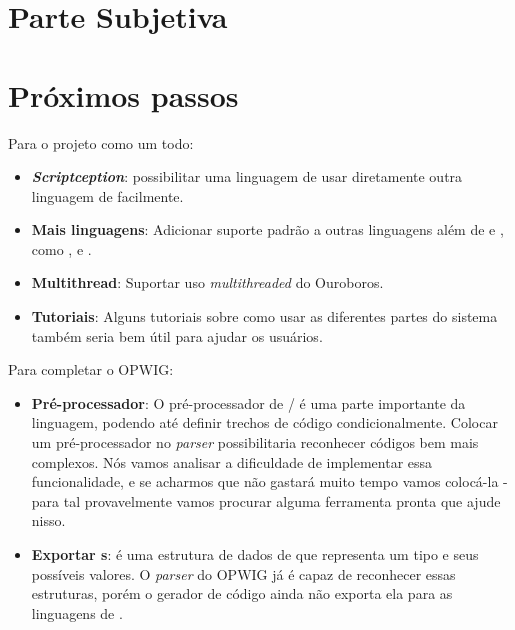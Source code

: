 \chapter*{Parte Subjetiva}
\label{sec:parte_subjetiva}

\newcommand\materia[3]{\noindent \textbf{#1} - \texttt{#2}\\\indent #3\vspace{0.5cm}\\}





\chapter{Próximos passos}
\label{sec:proximos_passos}

Para o projeto como um todo:
\begin{itemize}
  \item \emph{\textbf{Scriptception}}: possibilitar uma linguagem de \script{} usar diretamente
    outra linguagem de \script{} facilmente.
  \item \textbf{Mais linguagens}: Adicionar suporte padrão a outras linguagens além de 
    e , como ,  e .
  \item \textbf{Multithread}: Suportar uso \textit{multithreaded} do Ouroboros.
  \item \textbf{Tutoriais}: Alguns tutoriais sobre como usar as diferentes partes do
    sistema também seria bem útil para ajudar os usuários.
\end{itemize}

Para completar o OPWIG:
\begin{itemize}
  \item \textbf{Pré-processador}: O pré-processador de \C{}/\CXX{} é uma parte 
    importante da linguagem, podendo até definir trechos de código condicionalmente.
    Colocar um pré-processador no \textit{parser} possibilitaria reconhecer
    códigos \CXX{} bem mais complexos. Nós vamos analisar a dificuldade de implementar
    essa funcionalidade, e se acharmos que não gastará muito tempo vamos colocá-la -
    para tal provavelmente vamos procurar alguma ferramenta pronta que ajude nisso.
  \item \textbf{Exportar s}:  é uma estrutura de dados de \CXX{} 
    que representa um tipo e seus possíveis valores. O \textit{parser} do OPWIG já
    é capaz de reconhecer essas estruturas, porém o gerador de código ainda não
    exporta ela para as linguagens de \script{}.
\end{itemize}
